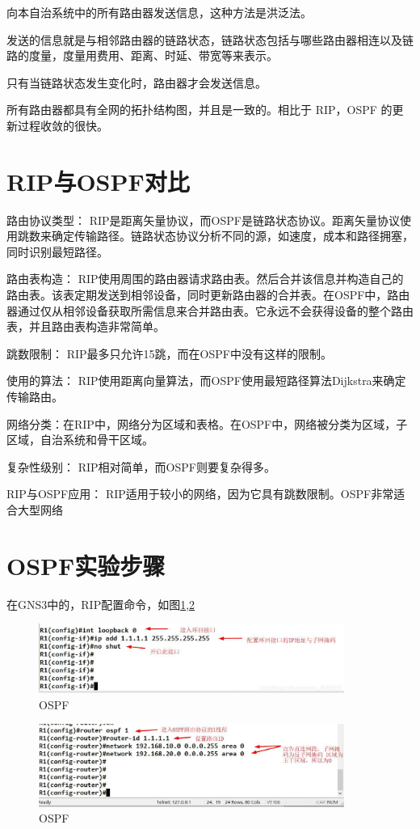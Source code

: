 \documentclass[a4paper,12pt]{report}
\begin{document}
\begin{spacing}{1.5}
向本自治系统中的所有路由器发送信息，这种方法是洪泛法。

发送的信息就是与相邻路由器的链路状态，链路状态包括与哪些路由器相连以及链路的度量，度量用费用、距离、时延、带宽等来表示。

只有当链路状态发生变化时，路由器才会发送信息。

所有路由器都具有全网的拓扑结构图，并且是一致的。相比于 RIP，OSPF 的更新过程收敛的很快。

\section{RIP与OSPF对比}

路由协议类型： RIP是距离矢量协议，而OSPF是链路状态协议。距离矢量协议使用跳数来确定传输路径。链路状态协议分析不同的源，如速度，成本和路径拥塞，同时识别最短路径。

路由表构造： RIP使用周围的路由器请求路由表。然后合并该信息并构造自己的路由表。该表定期发送到相邻设备，同时更新路由器的合并表。在OSPF中，路由器通过仅从相邻设备获取所需信息来合并路由表。它永远不会获得设备的整个路由表，并且路由表构造非常简单。

跳数限制： RIP最多只允许15跳，而在OSPF中没有这样的限制。

使用的算法： RIP使用距离向量算法，而OSPF使用最短路径算法Dijkstra来确定传输路由。

网络分类：在RIP中，网络分为区域和表格。在OSPF中，网络被分类为区域，子区域，自治系统和骨干区域。

复杂性级别： RIP相对简单，而OSPF则要复杂得多。

RIP与OSPF应用： RIP适用于较小的网络，因为它具有跳数限制。OSPF非常适合大型网络


\section{OSPF实验步骤}
在GNS3中的，RIP配置命令，如图\ref{ospf1},\ref{ospf2}
\begin{figure}[htb!]
  \centering
\includegraphics[width=10cm]{figure/ospf2.jpg}
  \caption{OSPF}
  \label{ospf1}
\end{figure} 

\begin{figure}[htb!]
  \centering
\includegraphics[width=10cm]{figure/ospf1.jpg}
  \caption{OSPF}
  \label{ospf2}
\end{figure} 


\end{spacing}
\end{document}
